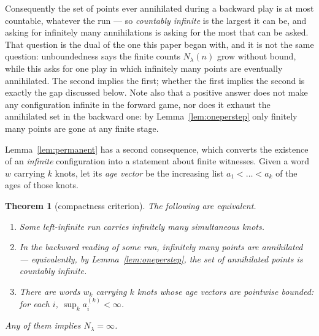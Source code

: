\documentclass[11pt,reqno]{amsart}
\theoremstyle{plain}
\newtheorem{theorem}{Theorem}
\theoremstyle{definition}
\theoremstyle{remark}
\begin{document}
Consequently the set of points ever annihilated during a backward play is at
most countable, whatever the run --- so \emph{countably infinite} is the
largest it can be, and asking for infinitely many annihilations is asking for
the most that can be asked. That question is the dual of the one this paper
began with, and it is not the same question: unboundedness says the finite
counts $N_\lambda(n)$ grow without bound, while this asks for one play in which
infinitely many points are eventually annihilated. The second implies the
first; whether the first implies the second is exactly the gap discussed below.
Note also that a positive answer does not make any configuration infinite in
the forward game, nor does it exhaust the annihilated set in the backward one:
by Lemma~\ref{lem:oneperstep} only finitely many points are gone at any finite
stage.

Lemma~\ref{lem:permanent} has a second consequence, which converts the
existence of an \emph{infinite} configuration into a statement about finite
witnesses. Given a word $w$ carrying $k$ knots, let its \emph{age vector} be
the increasing list $a_1<\dots<a_k$ of the ages of those knots.

\begin{theorem}[compactness criterion]\label{thm:compactness}
The following are equivalent.
\begin{enumerate}
\item Some left-infinite run carries infinitely many simultaneous knots.
\item In the backward reading of some run, infinitely many points are
  annihilated --- equivalently, by Lemma~\ref{lem:oneperstep}, the set of
  annihilated points is countably infinite.
\item There are words $w_k$ carrying $k$ knots whose age vectors are
  pointwise bounded: for each $i$, $\sup_k a_i^{(k)}<\infty$.
\end{enumerate}
Any of them implies $N_\lambda=\infty$.
\end{theorem}
\end{document}

